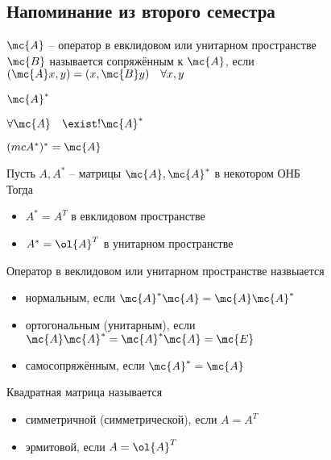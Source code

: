 \subsection{Напоминание из второго семестра}

\begin{definition}
	$ \mc{A} $ -- оператор в евклидовом или унитарном пространстве \\
	$ \mc{B} $ называется сопряжённым к $ \mc{A} $, если $ (\mc{A}x, y) = (x, \mc{B}y) \quad \forall x, y $
\end{definition}

\begin{notation}
	$ \mc{A}^* $
\end{notation}

\begin{theorem}
	$ \forall \mc{A} \quad \exist ! \mc{A}^* $
\end{theorem}

\begin{props}
	\item $ (mc{A}^*)^* = \mc{A} $
	\item Пусть $ A, A^* $ -- матрицы $ \mc{A}, \mc{A}^* $ в некотором ОНБ \\
	Тогда
	\begin{itemize}
		\item $ A^* = A^T $ в евклидовом пространстве
		\item $ A^* = \ol{A}^T $ в унитарном пространстве
	\end{itemize}
\end{props}

\begin{definition}
	Оператор в веклидовом или унитарном пространстве назвыается
	\begin{itemize}
		\item нормальным, если $ \mc{A}^*\mc{A} = \mc{A}\mc{A}^* $
		\item ортогональным (унитарным), если $ \mc{A}\mc{A}^* = \mc{A}^*\mc{A} = \mc{E} $
		\item самосопряжённым, если $ \mc{A}^* = \mc{A} $
	\end{itemize}
\end{definition}

\begin{definition}
	Квадратная матрица называется
	\begin{itemize}
		\item симметричной (симметрической), если $ A = A^T $
		\item эрмитовой, если $ A = \ol{A}^T $
	\end{itemize}
\end{definition}

